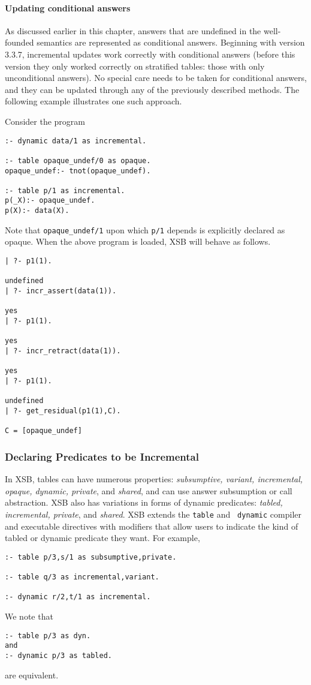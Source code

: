 \paragraph{Updating conditional answers}
%
As discussed earlier in this chapter, answers that are undefined in
the well-founded semantics are represented as conditional answers.
Beginning with version 3.3.7, incremental updates work correctly with
conditional answers (before this version they only worked correctly on
stratified tables: those with only unconditional answers).  No special
care needs to be taken for conditional answers, and they can be
updated through any of the previously described methods.  The
following example illustrates one such approach.  

Consider the program
%
\begin{verbatim}
:- dynamic data/1 as incremental.

:- table opaque_undef/0 as opaque.
opaque_undef:- tnot(opaque_undef).

:- table p/1 as incremental.
p(_X):- opaque_undef.
p(X):- data(X).
\end{verbatim}
%
Note that {\tt opaque\_undef/1} upon which {\tt p/1} depends is
explicitly declared as opaque.  When the above program is loaded, XSB
will behave as follows.
%
{\small
\begin{verbatim}
| ?- p1(1).

undefined
| ?- incr_assert(data(1)).

yes
| ?- p1(1).

yes
| ?- incr_retract(data(1)).

yes
| ?- p1(1).

undefined
| ?- get_residual(p1(1),C).

C = [opaque_undef]
\end{verbatim}
}
%



\subsubsection{Declaring Predicates to be Incremental}
%
In XSB, tables can have numerous properties: {\em subsumptive,
  variant, incremental, opaque, dynamic, private}, and {\em shared},
and can use answer subsumption or call abstraction.  XSB also has
variations in forms of dynamic predicates: {\em tabled, incremental,
  private}, and {\em shared}.  XSB extends the {\tt table} and {\tt
  dynamic} compiler and executable directives with modifiers that
allow users to indicate the kind of tabled or dynamic predicate they
want.  For example,
%
\begin{verbatim}
:- table p/3,s/1 as subsumptive,private.

:- table q/3 as incremental,variant.

:- dynamic r/2,t/1 as incremental.
\end{verbatim}
We note that
\begin{verbatim}
:- table p/3 as dyn.
and
:- dynamic p/3 as tabled.
\end{verbatim}
are equivalent.

